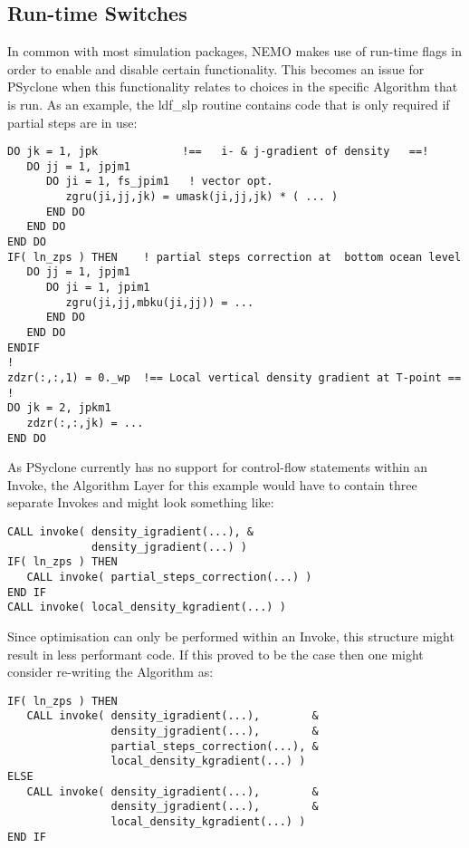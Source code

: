 \documentclass{article}
\begin{document}
\subsection{Run-time Switches}

In common with most simulation packages, NEMO makes use of run-time
flags in order to enable and disable certain functionality. This
becomes an issue for PSyclone when this functionality relates to
choices in the specific Algorithm that is run. As an example, the
ldf\_slp routine contains code that is only required if partial steps
are in use:

\begin{verbatim}
DO jk = 1, jpk             !==   i- & j-gradient of density   ==!
   DO jj = 1, jpjm1
      DO ji = 1, fs_jpim1   ! vector opt.
         zgru(ji,jj,jk) = umask(ji,jj,jk) * ( ... )
      END DO
   END DO
END DO
IF( ln_zps ) THEN    ! partial steps correction at  bottom ocean level
   DO jj = 1, jpjm1
      DO ji = 1, jpim1
         zgru(ji,jj,mbku(ji,jj)) = ...
      END DO
   END DO
ENDIF
!
zdzr(:,:,1) = 0._wp  !== Local vertical density gradient at T-point == !
DO jk = 2, jpkm1
   zdzr(:,:,jk) = ...
END DO
\end{verbatim}

As PSyclone currently has no support for control-flow statements
within an Invoke, the Algorithm Layer for this example would have to
contain three separate Invokes and might look something like:

\begin{verbatim}
CALL invoke( density_igradient(...), &
             density_jgradient(...) )
IF( ln_zps ) THEN
   CALL invoke( partial_steps_correction(...) )
END IF
CALL invoke( local_density_kgradient(...) )
\end{verbatim}

Since optimisation can only be performed within an Invoke, this
structure might result in less performant code. If this proved to be
the case then one might consider re-writing the Algorithm as:

\begin{verbatim}
IF( ln_zps ) THEN
   CALL invoke( density_igradient(...),        &
                density_jgradient(...),        &
                partial_steps_correction(...), &
                local_density_kgradient(...) )
ELSE
   CALL invoke( density_igradient(...),        &
                density_jgradient(...),        &
                local_density_kgradient(...) )
END IF
\end{verbatim}
\end{document}
